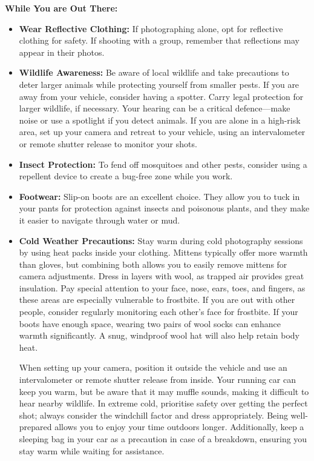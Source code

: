 \documentclass{article}
\begin{document}
\noindent\newline\textbf{While You are Out There:}    
\begin{itemize}
    \item \textbf{Wear Reflective Clothing:} If photographing alone, opt for reflective clothing for safety. If shooting with a group, remember that reflections may appear in their photos.
    \item \textbf{Wildlife Awareness:} Be aware of local wildlife and take precautions to deter larger animals while protecting yourself from smaller pests. If you are away from your vehicle, consider having a spotter. Carry legal protection for larger wildlife, if necessary. Your hearing can be a critical defence—make noise or use a spotlight if you detect animals. If you are alone in a high-risk area, set up your camera and retreat to your vehicle, using an intervalometer or remote shutter release to monitor your shots.
    \item \textbf{Insect Protection:} To fend off mosquitoes and other pests, consider using a repellent device to create a bug-free zone while you work.
    \item \textbf{Footwear:} Slip-on boots are an excellent choice. They allow you to tuck in your pants for protection against insects and poisonous plants, and they make it easier to navigate through water or mud.
    \item \textbf{Cold Weather Precautions:} Stay warm during cold photography sessions by using heat packs inside your clothing. Mittens typically offer more warmth than gloves, but combining both allows you to easily remove mittens for camera adjustments. Dress in layers with wool, as trapped air provides great insulation. Pay special attention to your face, nose, ears, toes, and fingers, as these areas are especially vulnerable to frostbite. If you are out with other people, consider regularly monitoring each other's face for frostbite. If your boots have enough space, wearing two pairs of wool socks can enhance warmth significantly. A snug, windproof wool hat will also help retain body heat.
    
    When setting up your camera, position it outside the vehicle and use an intervalometer or remote shutter release from inside. Your running car can keep you warm, but be aware that it may muffle sounds, making it difficult to hear nearby wildlife. In extreme cold, prioritise safety over getting the perfect shot; always consider the windchill factor and dress appropriately. Being well-prepared allows you to enjoy your time outdoors longer. Additionally, keep a sleeping bag in your car as a precaution in case of a breakdown, ensuring you stay warm while waiting for assistance.
\end{itemize}
\end{document}
